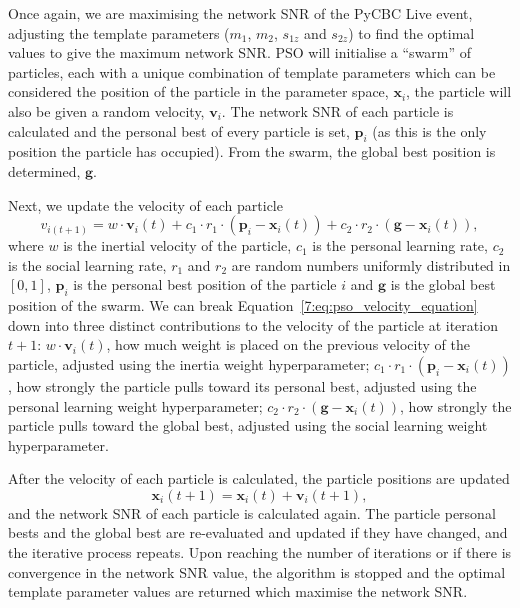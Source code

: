 Once again, we are maximising the network SNR of the PyCBC Live event, adjusting the template parameters ($m_{1}$, $m_{2}$, $s_{1z}$ and $s_{2z}$) to find the optimal values to give the maximum network SNR. PSO will initialise a ``swarm'' of particles, each with a unique combination of template parameters which can be considered the position of the particle in the parameter space, $\mathbf{x}_{i}$, the particle will also be given a random velocity, $\mathbf{v}_{i}$. The network SNR of each particle is calculated and the personal best of every particle is set, $\textbf{p}_{i}$ (as this is the only position the particle has occupied). From the swarm, the global best position is determined, $\textbf{g}$.

Next, we update the velocity of each particle
%
\begin{equation}
    v_{i(t+1)} = w \cdot \mathbf{v}_i(t) + c_1 \cdot r_1 \cdot (\mathbf{p}_i - \mathbf{x}_i(t)) + c_2 \cdot r_2 \cdot (\mathbf{g} - \mathbf{x}_i(t)),
    \label{7:eq:pso_velocity_equation}
\end{equation}
%
where $w$ is the inertial velocity of the particle, $c_{1}$ is the personal learning rate, $c_{2}$ is the social learning rate, $r_{1}$ and $r_{2}$ are random numbers uniformly distributed in $\left[0, 1\right]$, $\textbf{p}_{i}$ is the personal best position of the particle $i$ and $\textbf{g}$ is the global best position of the swarm. We can break Equation~\ref{7:eq:pso_velocity_equation} down into three distinct contributions to the velocity of the particle at iteration $t + 1$: $w \cdot \textbf{v}_{i}(t)$, how much weight is placed on the previous velocity of the particle, adjusted using the inertia weight hyperparameter; $c_{1} \cdot r_{1} \cdot \left(\textbf{p}_{i} - \textbf{x}_{i}(t)\right)$, how strongly the particle pulls toward its personal best, adjusted using the personal learning weight hyperparameter; $c_{2} \cdot r_{2} \cdot \left(\textbf{g} - \textbf{x}_{i}(t)\right)$, how strongly the particle pulls toward the global best, adjusted using the social learning weight hyperparameter.

After the velocity of each particle is calculated, the particle positions are updated
%
\begin{equation}
    \mathbf{x}_i(t+1) = \mathbf{x}_i(t) + \mathbf{v}_i(t+1),
\end{equation}
%
and the network SNR of each particle is calculated again. The particle personal bests and the global best are re-evaluated and updated if they have changed, and the iterative process repeats. Upon reaching the number of iterations or if there is convergence in the network SNR value, the algorithm is stopped and the optimal template parameter values are returned which maximise the network SNR.

